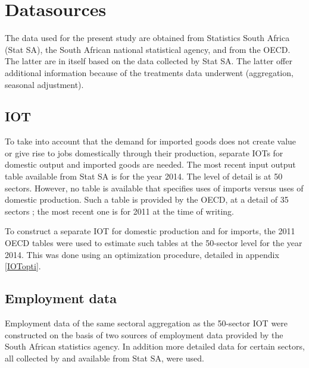 \documentclass[12pt,english]{article}
\begin{document}
\section{Datasources}

The data used for the present study are obtained from Statistics South Africa (Stat SA), the South African national statistical agency, and from the OECD. The latter are in itself based on the data collected by Stat SA. The latter offer additional information because of the treatments data underwent (aggregation, seasonal adjustment). %

\subsection{IOT}	

To take into account that the demand for imported goods does not create value or give rise to jobs domestically through their production, separate IOTs for domestic output and imported goods are needed. The most recent input output table available from Stat SA is for the year 2014. The level of detail is at 50 sectors. However, no table is available that specifies uses of imports versus uses of domestic production. Such a table is provided by the OECD, at a detail of 35 sectors ; the most recent one is for 2011 at the time of writing.

To construct a separate IOT for domestic production and for imports, the 2011 OECD tables were used to estimate such tables at the 50-sector level for the year 2014. This was done using an optimization procedure, detailed in appendix \ref{IOTopti}.


\subsection{Employment data}
Employment data of the same sectoral aggregation as the 50-sector IOT were constructed on the basis of two sources of employment data provided by the South African statistics agency. In addition more detailed data for certain sectors, all collected by and available from Stat SA, were used.
 
\end{document}
